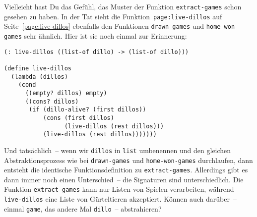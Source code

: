 Vielleicht hast Du das Gefühl, das Muster der Funktion
\lstinline{extract-games} schon gesehen zu haben.  In der Tat sieht
die Funktion~\lstinline{page:live-dillos} auf
Seite~\ref{page:live-dillos} ebenfalls den Funktionen
\lstinline{drawn-games} und \lstinline{home-won-games} sehr ähnlich.
Hier ist sie noch einmal zur Erinnerung:
%
\begin{lstlisting}
(: live-dillos ((list-of dillo) -> (list-of dillo)))

(define live-dillos
  (lambda (dillos)
    (cond
      ((empty? dillos) empty)
      ((cons? dillos)
       (if (dillo-alive? (first dillos))
           (cons (first dillos)
                 (live-dillos (rest dillos)))
           (live-dillos (rest dillos)))))))
\end{lstlisting}
%
Und tatsächlich~-- wenn wir \lstinline{dillos} in \lstinline{list}
umbenennen und den gleichen Abstraktionsprozess wie bei
\lstinline{drawn-games} und \lstinline{home-won-games} durchlaufen,
dann entsteht die identische Funktionsdefinition zu
\lstinline{extract-games}.  Allerdings gibt es dann immer noch einen
Unterschied~-- die Signaturen sind unterschiedlich.
Die Funktion \lstinline{extract-games} kann nur Listen von Spielen
verarbeiten, während \lstinline{live-dillos} eine Liste von
Gürteltieren akzeptiert.  Können auch darüber~-- einmal
\lstinline{game}, das andere Mal \lstinline{dillo}~-- abstrahieren?

